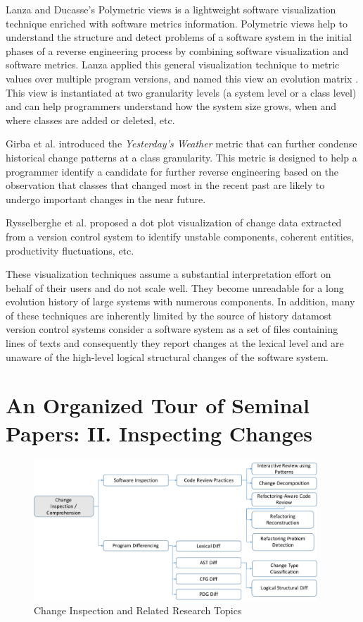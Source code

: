 \documentclass[runningheads,a4paper]{llncs}
\begin{document}
Lanza and Ducasse's Polymetric views \cite{Lanza2003} is a lightweight software visualization technique enriched with software metrics information. Polymetric views help to understand the structure and detect problems of a software system in the initial phases of a reverse engineering process by combining software visualization and software metrics. Lanza applied this general visualization technique to metric values over multiple program versions, and named this view an evolution matrix \cite{Lanza2001}. This view is instantiated at two granularity levels (a system level or a class level) and can help programmers understand how the system size grows, when and where classes are added or deleted, etc. 

Girba et al. \cite{Girba2004} introduced the {\it Yesterday's Weather} metric that can further condense historical change patterns at a class granularity. This metric is designed to help a programmer identify a candidate for further reverse engineering based on the observation that classes that changed most in the recent past are likely to undergo important changes in the near future. 
 
Rysselberghe et al. \cite{Rysselberghe2004a} proposed a dot plot visualization of change data extracted from a version control system to identify unstable components, coherent entities, productivity fluctuations, etc.  

These visualization techniques assume a substantial interpretation effort on behalf of their users and do not scale well. They become unreadable for a long evolution history of large systems with numerous components. In addition, many of these techniques are inherently limited by the source of history data\textemdash most version control systems consider a software system as a set of files containing lines of texts and consequently they report changes at the lexical level and are unaware of the high-level logical structural changes of the software system. 

\section{An Organized Tour of Seminal Papers: II. Inspecting Changes}
\label{sec:inspect}

\begin{figure}[ht]
 \centering
 \includegraphics[width=0.95\textwidth]{images/ChangeInspection.pdf}
 \caption{Change Inspection and Related Research Topics} 
 \label{fig:changeinspection} 
\end{figure}
\end{document}
